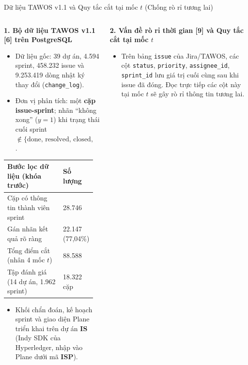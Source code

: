 \begin{frame}{Dữ liệu TAWOS v1.1 và Quy tắc cắt tại mốc $t$ (Chống rò rỉ tương lai)}
  \scriptsize
  \begin{columns}[T,onlytextwidth]
    \begin{column}{0.48\textwidth}
      \textbf{1. Bộ dữ liệu TAWOS v1.1 [6] trên PostgreSQL}
      \begin{itemize}
        \setlength{\itemsep}{1.5pt}
        \item Dữ liệu gốc: 39 dự án, 4.594 sprint, 458.232 issue và 9.253.419 dòng nhật ký thay đổi (\texttt{change\_log}).
        \item Đơn vị phân tích: một \textbf{cặp issue-sprint}; nhãn ``không xong'' ($y = 1$) khi trạng thái cuối sprint $\notin \{\text{done, resolved, closed, complete}\}$.
      \end{itemize}
      \vspace{0.08cm}
      \setlength{\tabcolsep}{4pt}
      \renewcommand{\arraystretch}{1.18}
      \begin{tabular}{L{0.62\linewidth}|R{0.31\linewidth}}
        \textbf{Bước lọc dữ liệu (khóa trước)} & \textbf{Số lượng} \\
        \hline
        Cặp có thông tin thành viên sprint & 28.746 \\
        Gán nhãn kết quả rõ ràng & 22.147 (77,04\%) \\
        Tổng điểm cắt (nhân 4 mốc $t$) & 88.588 \\
        \alert{Tập đánh giá (14 dự án, 1.962 sprint)} & \alert{18.322 cặp} \\
      \end{tabular}
      \vspace{0.08cm}
      \begin{itemize}
        \setlength{\itemsep}{1.5pt}
        \item Khối chẩn đoán, kế hoạch sprint và giao diện Plane triển khai trên dự án \textbf{IS} (Indy SDK của Hyperledger, nhập vào Plane dưới mã \textbf{ISP}).
      \end{itemize}
    \end{column}
    \begin{column}{0.49\textwidth}
      \textbf{2. Vấn đề rò rỉ thời gian [9] và Quy tắc cắt tại mốc $t$}
      \begin{itemize}
        \setlength{\itemsep}{1.5pt}
        \item Trên bảng \texttt{issue} của Jira/TAWOS, các cột \texttt{status}, \texttt{priority}, \texttt{assignee\_id}, \texttt{sprint\_id} lưu \alert{giá trị cuối cùng sau khi issue đã đóng}. Đọc trực tiếp các cột này tại mốc $t$ sẽ gây rò rỉ thông tin tương lai.

\end{itemize}
\end{column}
\end{columns}
\end{frame}
